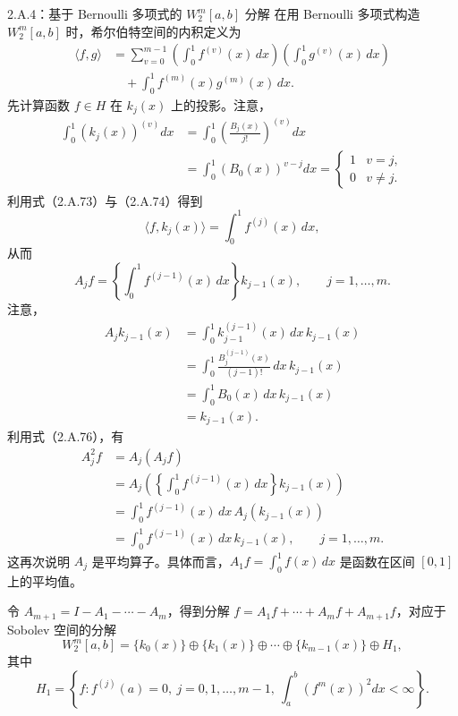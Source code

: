 \begin{bookexample}{2.A.4：基于 Bernoulli 多项式的 $W_2^m[a,b]$ 分解}
在用 Bernoulli 多项式构造 $W_2^m[a,b]$ 时，希尔伯特空间的内积定义为
\begin{equation}
\begin{aligned}
\langle f,g\rangle
 &=\sum_{v=0}^{m-1}
  \left(\int_0^1f^{(v)}(x)\,dx\right)
  \left(\int_0^1g^{(v)}(x)\,dx\right)\\
 &\quad+\int_0^1f^{(m)}(x)g^{(m)}(x)\,dx.
\end{aligned}\tag{2.A.73}
\end{equation}
先计算函数 $f\in H$ 在 $k_j(x)$ 上的投影。注意，
\begin{equation}
\begin{aligned}
\int_0^1(k_j(x))^{(v)}dx
 &=\int_0^1\left(\frac{B_j(x)}{j!}\right)^{(v)}dx\\
 &=\int_0^1(B_0(x))^{v-j}dx
 =\begin{cases}1&v=j,\\0&v\ne j.\end{cases}
\end{aligned}\tag{2.A.74}
\end{equation}
利用式（2.A.73）与（2.A.74）得到
\[
\langle f,k_j(x)\rangle=\int_0^1f^{(j)}(x)\,dx,
\]
从而
\begin{equation}
A_jf=\left\{\int_0^1f^{(j-1)}(x)\,dx\right\}k_{j-1}(x),
\qquad j=1,\ldots,m.\tag{2.A.75}
\end{equation}
注意，
\begin{equation}
\begin{aligned}
A_jk_{j-1}(x)
 &=\int_0^1k_{j-1}^{(j-1)}(x)\,dx\,k_{j-1}(x)\\
 &=\int_0^1\frac{B_j^{(j-1)}(x)}{(j-1)!}\,dx\,k_{j-1}(x)\\
 &=\int_0^1B_0(x)\,dx\,k_{j-1}(x)\\
 &=k_{j-1}(x).
\end{aligned}\tag{2.A.76}
\end{equation}
利用式（2.A.76），有
\begin{equation}
\begin{aligned}
A_j^2f&=A_j(A_jf)\\
 &=A_j\left(\left\{\int_0^1f^{(j-1)}(x)\,dx\right\}k_{j-1}(x)\right)\\
 &=\int_0^1f^{(j-1)}(x)\,dx\,A_j(k_{j-1}(x))\\
 &=\int_0^1f^{(j-1)}(x)\,dx\,k_{j-1}(x),\qquad j=1,\ldots,m.
\end{aligned}\tag{2.A.77}
\end{equation}
这再次说明 $A_j$ 是平均算子。具体而言，$A_1f=\int_0^1f(x)\,dx$ 是函数在区间 $[0,1]$ 上的平均值。

令 $A_{m+1}=I-A_1-\cdots-A_m$，得到分解 $f=A_1f+\cdots+A_mf+A_{m+1}f$，对应于 Sobolev 空间的分解
\begin{equation}
W_2^m[a,b]=\{k_0(x)\}\oplus\{k_1(x)\}\oplus\cdots
 \oplus\{k_{m-1}(x)\}\oplus H_1,\tag{2.A.78}
\end{equation}
其中
\[
H_1=\left\{f:f^{(j)}(a)=0,\ j=0,1,\ldots,m-1,\
            \int_a^b(f^m(x))^2dx<\infty\right\}.
\]
\end{bookexample}

